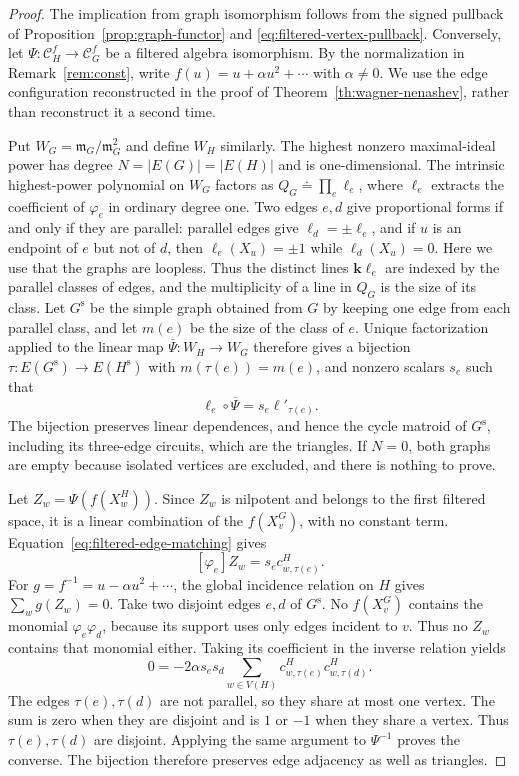 \documentclass[reqno]{article}
\theoremstyle{plain} %
\theoremstyle{definition}
\theoremstyle{remark}
\newcommand{\K} {\mathbf{k}}
\newcommand {\CC}{\mathscr{C}}
\numberwithin{equation}{section}
\begin{document}
\begin{proof}
The implication from graph isomorphism follows from the signed
pullback of Proposition~\ref{prop:graph-functor} and
\eqref{eq:filtered-vertex-pullback}. Conversely, let
$\Psi:\CC_H^f\longrightarrow\CC_G^f$ be a filtered algebra isomorphism.
By the normalization in Remark~\ref{rem:const}, write
$f(u)=u+\alpha u^2+\cdots$ with $\alpha\ne0$.
We use the edge configuration reconstructed in the proof of
Theorem~\ref{th:wagner-nenashev}, rather than reconstruct it a second time.

Put $W_G=\mathfrak m_G/\mathfrak m_G^2$ and define $W_H$ similarly.
The highest nonzero maximal-ideal power has degree
$N=|E(G)|=|E(H)|$ and is one-dimensional. The intrinsic highest-power
polynomial on $W_G$ factors as $Q_G\doteq\prod_e\ell_e$, where
$\ell_e$ extracts the coefficient of $\varphi_e$ in ordinary degree
one. Two edges $e,d$ give proportional forms if and only if they are
parallel: parallel edges give $\ell_d=\pm\ell_e$, and if $u$ is an
endpoint of $e$ but not of $d$, then $\ell_e(X_u)=\pm1$ while
$\ell_d(X_u)=0$. Here we use that the graphs are loopless. Thus the
distinct lines $\K\ell_e$ are indexed by the parallel classes of edges,
and the multiplicity of a line in $Q_G$ is the size of its class.
Let $G^{\mathrm s}$ be the simple graph obtained from $G$ by keeping one
edge from each parallel class, and let $m(e)$ be the size of the class
of $e$. Unique factorization applied to the linear map
$\overline\Psi:W_H\to W_G$ therefore gives a bijection
$\tau:E(G^{\mathrm s})\to E(H^{\mathrm s})$ with $m(\tau(e))=m(e)$, and
nonzero scalars $s_e$ such that
\begin{equation}\label{eq:filtered-edge-matching}
\ell_e\circ\overline\Psi=s_e\ell'_{\tau(e)}.
\end{equation}
The bijection preserves linear dependences, and hence the cycle
matroid of $G^{\mathrm s}$, including its three-edge circuits, which
are the triangles. If $N=0$, both graphs are empty because isolated
vertices are excluded, and there is nothing to prove.

Let $Z_w=\Psi(f(X_w^H))$. Since $Z_w$ is nilpotent and belongs to the
first filtered space, it is a linear combination of the $f(X_v^G)$,
with no constant term. Equation~\eqref{eq:filtered-edge-matching} gives
\[
[\varphi_e]Z_w=s_ec^H_{w,\tau(e)}.
\]
For $g=f^{-1}=u-\alpha u^2+\cdots$, the global incidence relation
on $H$ gives $\sum_wg(Z_w)=0$.
Take two disjoint edges $e,d$ of $G^{\mathrm s}$. No $f(X_v^G)$ contains the
monomial $\varphi_e\varphi_d$, because its support uses only edges
incident to $v$. Thus no $Z_w$ contains that monomial either.
Taking its coefficient in the inverse relation yields
\begin{equation}\label{eq:filtered-incidence-test}
0=-2\alpha s_es_d
\sum_{w\in V(H)}c^H_{w,\tau(e)}c^H_{w,\tau(d)}.
\end{equation}
The edges $\tau(e),\tau(d)$ are not parallel, so they share at most one
vertex. The sum is zero when they are disjoint and is $1$ or $-1$ when
they share a vertex. Thus $\tau(e),\tau(d)$ are disjoint. Applying the same argument to
$\Psi^{-1}$ proves the converse. The bijection therefore preserves
edge adjacency as well as triangles.


\end{proof}
\end{document}
